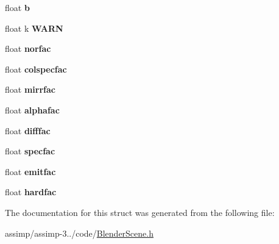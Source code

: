 \begin{DoxyCompactItemize}
\item 
\hypertarget{struct_assimp_1_1_blender_1_1_m_tex_aac4ffe9cbd1ce5b23b03f871e282eef0}{float {\bfseries b}}\label{struct_assimp_1_1_blender_1_1_m_tex_aac4ffe9cbd1ce5b23b03f871e282eef0}

\item 
\hypertarget{struct_assimp_1_1_blender_1_1_m_tex_a93f893dd45d79207529973fcd31c21fe}{float k {\bfseries W\+A\+R\+N}}\label{struct_assimp_1_1_blender_1_1_m_tex_a93f893dd45d79207529973fcd31c21fe}

\item 
\hypertarget{struct_assimp_1_1_blender_1_1_m_tex_a0459f05a66b2c0a4e3d4ec9ed5c520ad}{float {\bfseries norfac}}\label{struct_assimp_1_1_blender_1_1_m_tex_a0459f05a66b2c0a4e3d4ec9ed5c520ad}

\item 
\hypertarget{struct_assimp_1_1_blender_1_1_m_tex_a77063f310ef4989975798f55d15ce598}{float {\bfseries colspecfac}}\label{struct_assimp_1_1_blender_1_1_m_tex_a77063f310ef4989975798f55d15ce598}

\item 
\hypertarget{struct_assimp_1_1_blender_1_1_m_tex_ac2a73852b141c670ad7b6b2007b4a3ee}{float {\bfseries mirrfac}}\label{struct_assimp_1_1_blender_1_1_m_tex_ac2a73852b141c670ad7b6b2007b4a3ee}

\item 
\hypertarget{struct_assimp_1_1_blender_1_1_m_tex_abddcf4ec89b3b567e2aa67139582c11a}{float {\bfseries alphafac}}\label{struct_assimp_1_1_blender_1_1_m_tex_abddcf4ec89b3b567e2aa67139582c11a}

\item 
\hypertarget{struct_assimp_1_1_blender_1_1_m_tex_a26a320ac5d3eb9511426b8585a93327c}{float {\bfseries difffac}}\label{struct_assimp_1_1_blender_1_1_m_tex_a26a320ac5d3eb9511426b8585a93327c}

\item 
\hypertarget{struct_assimp_1_1_blender_1_1_m_tex_a7dd23f136a3a4d07aaadec15b0a3ce53}{float {\bfseries specfac}}\label{struct_assimp_1_1_blender_1_1_m_tex_a7dd23f136a3a4d07aaadec15b0a3ce53}

\item 
\hypertarget{struct_assimp_1_1_blender_1_1_m_tex_acf7c3cd05c196e921379c3cffa5e4550}{float {\bfseries emitfac}}\label{struct_assimp_1_1_blender_1_1_m_tex_acf7c3cd05c196e921379c3cffa5e4550}

\item 
\hypertarget{struct_assimp_1_1_blender_1_1_m_tex_a1f1c79b96c2e3199bdba41e313a7919e}{float {\bfseries hardfac}}\label{struct_assimp_1_1_blender_1_1_m_tex_a1f1c79b96c2e3199bdba41e313a7919e}

\end{DoxyCompactItemize}


The documentation for this struct was generated from the following file\+:\begin{DoxyCompactItemize}
\item 
assimp/assimp-\/3../code/\hyperlink{_blender_scene_8h}{Blender\+Scene.\+h}\end{DoxyCompactItemize}
